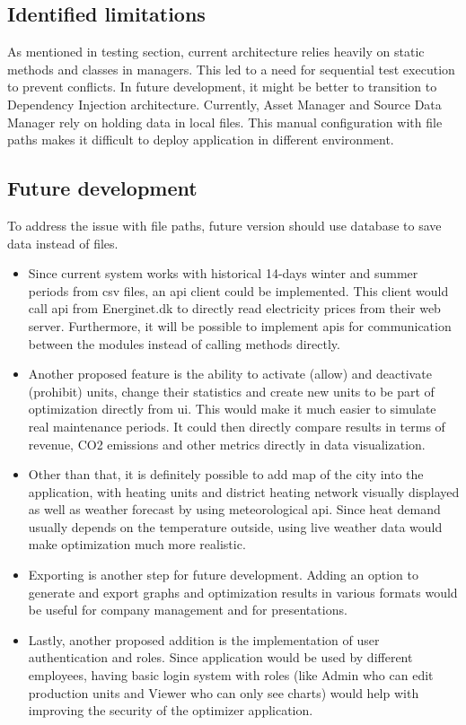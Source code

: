 \subsection{Identified limitations}
As mentioned in testing section, current architecture relies heavily on static methods and classes in managers. This led to a need for sequential test execution to prevent conflicts. In future development, it might be better to transition to Dependency Injection architecture. Currently, Asset Manager and Source Data Manager rely on holding data in local files. This manual configuration with file paths makes it difficult to deploy application in different environment.

\subsection{Future development}
To address the issue with file paths, future version should use database to save data instead of files.
\begin{itemize}
    \item Since current system works with historical 14-days winter and summer periods from \acrshort{csv} files, an \acrshort{api} client could be implemented. This client would call \acrshort{api} from Energinet.dk to directly read electricity prices from their web server. Furthermore, it will be possible to implement \acrshort{api}s for communication between the modules instead of calling methods directly.
    \item Another proposed feature is the ability to activate (allow) and deactivate (prohibit) units, change their statistics and create new units to be part of optimization directly from \acrshort{ui}. This would make it much easier to simulate real maintenance periods. It could then directly compare results in terms of revenue, CO2 emissions and other metrics directly in data visualization.
    \item Other than that, it is definitely possible to add map of the city into the application, with heating units and district heating network visually displayed as well as weather forecast by using meteorological \acrshort{api}. Since heat demand usually depends on the temperature outside, using live weather data would make optimization much more realistic.
    \item Exporting is another step for future development. Adding an option to generate and export graphs and optimization results in various formats would be useful for company management and for presentations.
    \item Lastly, another proposed addition is the implementation of user authentication and roles. Since application would be used by different employees, having basic login system with roles (like Admin who can edit production units and Viewer who can only see charts) would help with improving the security of the optimizer application.
\end{itemize}
